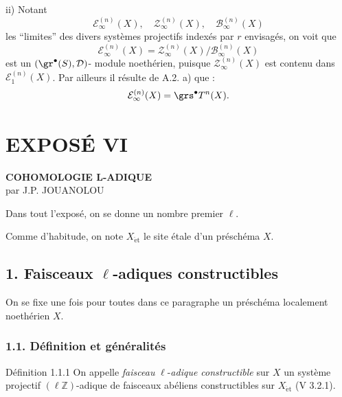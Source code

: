 \begin{prooftext}
ii) Notant
\[
\mathcal{E}_\infty^{(n)}(X),\quad
\mathcal{Z}_\infty^{(n)}(X),\quad
\mathcal{B}_\infty^{(n)}(X)
\]
les ``limites'' des divers systèmes projectifs indexés par \(r\) envisagés, on voit que
\[
\mathcal{E}_\infty^{(n)}(X)=
\mathcal{Z}_\infty^{(n)}(X)/\mathcal{B}_\infty^{(n)}(X)
\]
est un \((\gr^\bullet(S),\mathcal{D})\)-
module noethérien, puisque \(\mathcal{Z}_\infty^{(n)}(X)\) est contenu dans \(\mathcal{E}_1^{(n)}(X)\). Par ailleurs il résulte de A.2. a) que :
\[
\mathcal{E}_\infty^{(n)}(X)=\grs^\bullet T^n(X).
\]
\end{prooftext}

\renewenvironment{prooftext}[1][Proof]{\par\noindent\emph{#1.}\ }{\par\medskip}
\section*{EXPOSÉ VI}

\begin{center}
\textbf{COHOMOLOGIE L-ADIQUE}\\[0.5em]
par J.P. JOUANOLOU
\end{center}

Dans tout l'exposé, on se donne un nombre premier \(\ell\).

Comme d'habitude, on note \(X_{\mathrm{\acute et}}\) le site étale d'un préschéma \(X\).

\subsection*{1. Faisceaux \(\ell\)-adiques constructibles}

On se fixe une fois pour toutes dans ce paragraphe un préschéma localement noethérien \(X\).

\subsubsection*{1.1. Définition et généralités}

\begin{statement}{Définition 1.1.1}
On appelle \emph{faisceau} \(\ell\)-\emph{adique constructible} sur \(X\) un système projectif \((\ell\mathbb{Z})\)-adique de faisceaux abéliens constructibles sur \(X_{\mathrm{\acute et}}\) (V 3.2.1).
\end{statement}

